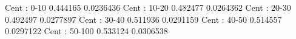 Cent : 0-10
0.444165 0.0236436
Cent : 10-20
0.482477 0.0264362
Cent : 20-30
0.492497 0.0277897
Cent : 30-40
0.511936 0.0291159
Cent : 40-50
0.514557 0.0297122
Cent : 50-100
0.533124 0.0306538
